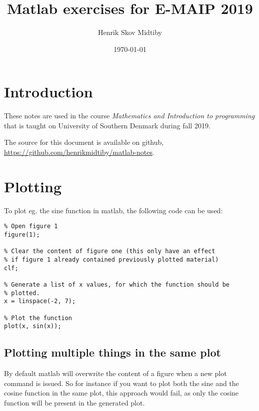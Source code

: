 \documentclass[fleqn, 12pt,a4paper]{article}
\author{Henrik Skov Midtiby}
\title{Matlab exercises for E-MAIP 2019}
\date{\today}
\newcounter{ex}
\numberwithin{ex}{section}
\begin{document}
\maketitle

\newpage
\tableofcontents

\newpage
\section*{Introduction}

These notes are used in the course \emph{Mathematics and Introduction to programming}
that is taught on University of Southern Denmark during fall 2019.

The source for this document is available on github, 
\url{https://github.com/henrikmidtiby/matlab-notes}.

















\section{Plotting}

To plot eg. the sine function in matlab, the following code
can be used:
\begin{lstlisting}
% Open figure 1
figure(1);

% Clear the content of figure one (this only have an effect 
% if figure 1 already contained previously plotted material)
clf;

% Generate a list of x values, for which the function should be 
% plotted.
x = linspace(-2, 7);

% Plot the function
plot(x, sin(x));
\end{lstlisting}

\subsection{Plotting multiple things in the same plot}

By default matlab will overwrite the content of a figure
when a new plot command is issued.
So for instance if you want to plot both the sine and the cosine 
function in the same plot, this approach would fail, as only the 
cosine function will be present in the generated plot.
\end{document}
